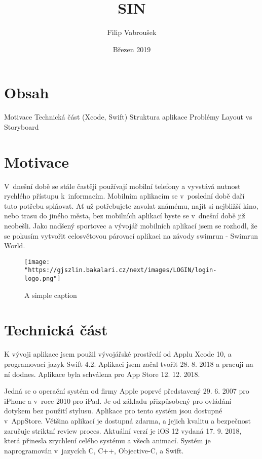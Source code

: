 \documentclass{article}
\title{SIN}
\author{Filip Vabroušek }
\date{Březen 2019}
\begin{document}
\maketitle

\section{Obsah}

Motivace \hfill \break
Technická část (Xcode, Swift)  \hfill \break
Struktura aplikace  \hfill \break
Problémy  \hfill \break
Layout vs Storyboard  \hfill \break
\vspace{10 mm}

\section{Motivace}

	V dnešní době se stále častěji používají mobilní telefony a vyvstává nutnost rychlého  přístupu k informacím. Mobilním aplikacím se v poslední době daří tuto potřebu splňovat. Ať už potřebujete zavolat známému, najít si nejbližší kino, nebo trasu do jiného města, bez mobilních aplikací byste se v dnešní době již neobešli. Jako nadšený sportovec a vývojář mobilních aplikací jsem se rozhodl, že se pokusím vytvořit celosvětovou párovací aplikaci na závody swimrun - Swimrun World.

\begin{figure}[ht!]
\centering
\texttt{[image: "https://gjszlin.bakalari.cz/next/images/LOGIN/login-logo.png"]}
\caption{A simple caption \label{overflow}}
\end{figure}


\vspace{10 mm}
\section{Technická část}

K vývoji aplikace jsem použil vývojářské prostředí od Applu Xcode 10, a programovací jazyk Swift 4.2. Aplikaci jsem začal tvořit 28. 8. 2018 a pracuji na ní dodnes. Aplikace byla schválena pro App Store 12. 12. 2018. 


\vspace{10 mm}

	Jedná se o operační systém od firmy Apple poprvé představený 29. 6. 2007 pro iPhone a v roce 2010 pro iPad.  Je od základu přizpůsobený pro ovládání dotykem bez použití stylusu. Aplikace pro tento systém jsou dostupné v AppStore. Většina aplikací je dostupná zdarma, a jejich kvalitu a bezpečnost zaručuje striktní review proces. Aktuální verzí je iOS 12 vydaná 17. 9. 2018, která přinesla zrychlení celého systému a všech animací. Systém je naprogramován v jazycích C, C++, Objective-C, a Swift.
\end{document}
